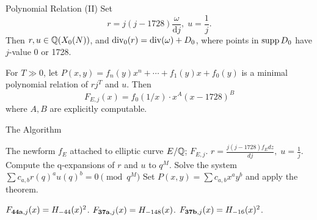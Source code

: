 \documentclass[handout]{beamer}
\begin{document}
\begin{frame}{Polynomial Relation (II)}
Set \[
r = j(j-1728)  \frac{\omega }{{\mathrm{d}j}}, \;  u = \frac{1}{j}.
\]
Then $r, u \in \mathbb{Q}(X_0(N))$, and $\operatorname{div}_0(r)  = \operatorname{div}(\omega) + D_0$, where points in $\operatorname{supp} D_0$ have $j$-value 0 or 1728.  \\

\smallskip 

\pause


\begin{Prop}[C.]
For $T \gg 0$, let $P(x,y) = f_n(y)x^n + \cdots + f_1(y)x + f_0(y)$ is a minimal polynomial relation of $rj^T$ and $u$. Then
\[
		F_{E,j}(x) = f_0(1/x) \cdot x^{A} (x - 1728)^B
\]	
where $A,B$ are explicitly computable. 
\end{Prop}

\end{frame}

\begin{frame}{The Algorithm}

\begin{algorithm}[H]
\begin{algorithmic}[[1]
\Require The newform $f_E$ attached to elliptic curve $E/\mathbb{Q}$; 
\Ensure $F_{E,j}$.  
\State $r = \frac{j(j-1728) f_E dz }{dj}, \;  u = \frac{1}{j}$. 
\State Compute the q-expansions of $r$ and $u$ to $q^M$. 
\State Solve the system $\sum c_{a,b}r(q)^au(q)^b = 0 \pmod {q^M} $
\State Set $P(x,y) = \sum c_{a,b}x^ay^b$ and apply the theorem.
\end{algorithmic}
\end{algorithm}
\begin{Example}
$F_{{\bf 44a},j}(x) = H_{-44}(x)^2$. $F_{{\bf 37a},j}(x) = H_{-148}(x)$. $F_{{\bf 37b},j}(x) = H_{-16}(x)^2$.
\end{Example}


\end{frame}


\end{document}
